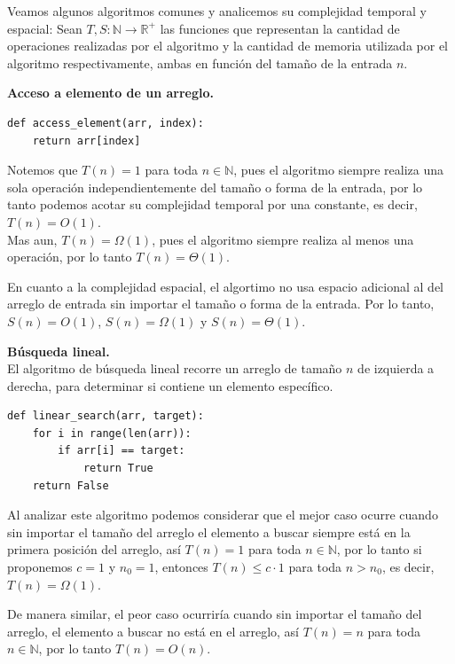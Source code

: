 \documentclass[
 12pt,
 letterpaper,
]{article}
\theoremstyle{teoremaBreak}
\theoremstyle{plain}
\theoremstyle{definition}
\begin{document}
Veamos algunos algoritmos comunes y analicemos su complejidad temporal y espacial:
Sean $T,S: \mathbb{N} \to \mathbb{R}^+$ las funciones que representan la cantidad de operaciones realizadas por el algoritmo y la cantidad
de memoria utilizada por el algoritmo respectivamente, ambas en función del tamaño de la entrada $n$. 

\textbf{Acceso a elemento de un arreglo.}\\
\begin{lstlisting}[style=pseudocodigo]
def access_element(arr, index):
    return arr[index]
\end{lstlisting}

Notemos que $T(n) = 1$ para toda $n \in \mathbb{N}$, pues el algoritmo siempre realiza una sola 
operación independientemente del tamaño o forma de la entrada, por lo tanto podemos acotar 
su complejidad temporal por una constante, es decir, $T(n) = O(1)$.\\
Mas aun, $T(n) = \Omega(1)$, pues el algoritmo siempre realiza al menos una operación, por lo tanto $T(n) = \Theta(1)$.

En cuanto a la complejidad espacial, el algortimo no usa espacio adicional al del arreglo
de entrada sin importar el tamaño o forma de la entrada. 
Por lo tanto, $S(n) = O(1)$, $S(n) = \Omega(1)$ y $S(n) = \Theta(1)$.


\textbf{Búsqueda lineal.}\\
El algoritmo de búsqueda lineal recorre un arreglo de tamaño $n$ de izquierda a derecha,
 para determinar si contiene un elemento específico.\\

\begin{lstlisting}[style=pseudocodigo]
def linear_search(arr, target):
    for i in range(len(arr)):
        if arr[i] == target:
            return True
    return False
\end{lstlisting}

Al analizar este algoritmo podemos considerar que el mejor caso ocurre cuando sin importar el tamaño del arreglo
el elemento a buscar siempre está en la primera posición del arreglo, así $T(n) = 1$ para toda $n \in \mathbb{N}$, por 
lo tanto si proponemos $c = 1$ y $n_0 = 1$, entonces $T(n) \leq c \cdot 1$ para toda $n > n_0$, es decir, $T(n) = \Omega(1)$.

De manera similar, el peor caso ocurriría cuando sin importar el tamaño del arreglo, el elemento a buscar 
no está en el arreglo, así $T(n) = n$ para toda $n \in \mathbb{N}$, por lo tanto $T(n) = O(n)$.
\end{document}
